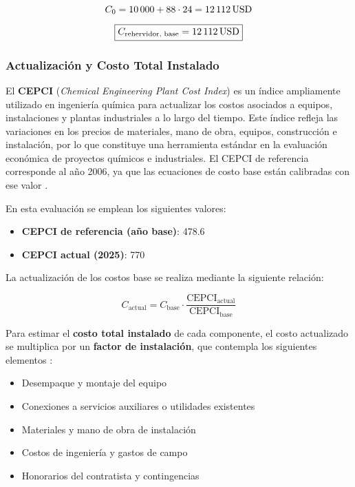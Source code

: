 \[
    C_0 = 10\,000 + 88 \cdot 24 = \SI{12\,112}{USD}
\]

\[
    \boxed{C_{\text{rehervidor, base}} = \SI{12\,112}{USD}}
\]

\bigskip

\subsubsection{Actualización y Costo Total Instalado}

El \textbf{CEPCI} (\textit{Chemical Engineering Plant Cost Index}) es un índice ampliamente utilizado en ingeniería química para actualizar los costos asociados a equipos, instalaciones y plantas industriales a lo largo del tiempo. Este índice refleja las variaciones en los precios de materiales, mano de obra, equipos, construcción e instalación, por lo que constituye una herramienta estándar en la evaluación económica de proyectos químicos e industriales. El CEPCI de referencia corresponde al año 2006, ya que las ecuaciones de costo base están calibradas con ese valor \parencite[p.~321]{towler2013chemical}.

En esta evaluación se emplean los siguientes valores:

\begin{itemize}
    \item \textbf{CEPCI de referencia (año base)}: 478.6
    \item \textbf{CEPCI actual (2025)}: 770
\end{itemize}

La actualización de los costos base se realiza mediante la siguiente relación:

\[
    C_{\text{actual}} = C_{\text{base}} \cdot \frac{\text{CEPCI}_{\text{actual}}}{\text{CEPCI}_{\text{base}}}
\]

Para estimar el \textbf{costo total instalado} de cada componente, el costo actualizado se multiplica por un \textbf{factor de instalación}, que contempla los siguientes elementos \parencite[p.~9-68]{perry1997chemical}:

\begin{itemize}
    \item Desempaque y montaje del equipo
    \item Conexiones a servicios auxiliares o utilidades existentes
    \item Materiales y mano de obra de instalación
    \item Costos de ingeniería y gastos de campo
    \item Honorarios del contratista y contingencias
\end{itemize}

